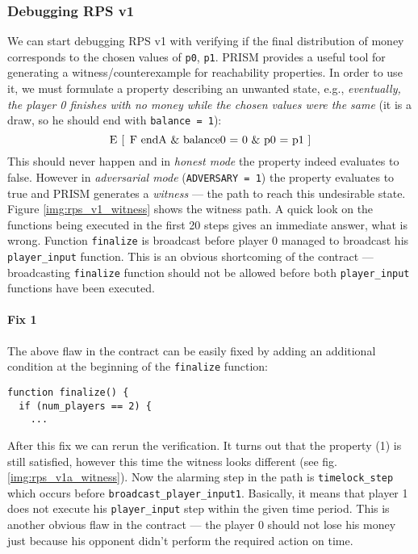 \documentclass{article}
\begin{document}
\subsubsection{Debugging RPS v1}
We can start debugging RPS v1 with verifying if the final distribution of money corresponds to the chosen values 
of \lstinline{p0}, \lstinline{p1}.
PRISM provides a useful tool for generating a witness/counterexample for reachability properties.
In order to use it, we must formulate a property describing an unwanted state, e.g., 
\textit{eventually, the player 0 finishes with no money
while the chosen values were the same} (it is a draw, so he should end with \lstinline{balance = 1}):
\begin{equation}
\text{\lstinline{E [ F endA & balance0 = 0 & p0 = p1 ]}}
\label{prop:rps_v1_witness}
\end{equation}
This should never happen and in \emph{honest mode} the property indeed evaluates to false.
However in \emph{adversarial mode} (\lstinline{ADVERSARY = 1}) the property evaluates to true and PRISM
generates a \emph{witness} --- the path to reach this undesirable state.
Figure \ref{img:rps_v1_witness} shows the witness path.
A quick look on the functions being executed in the first 20 steps gives an immediate answer, what is wrong.
Function \lstinline{finalize} is broadcast before player 0 managed to broadcast his \lstinline{player_input} function.
This is an obvious shortcoming of the contract --- broadcasting \lstinline{finalize} function should not be allowed
before both \lstinline{player_input} functions have been executed.

\paragraph{Fix 1} 

The above flaw in the contract can be easily fixed by adding an additional condition at the beginning of the 
\lstinline{finalize} function:
\begin{lstlisting}
function finalize() {
  if (num_players == 2) {
    ...
\end{lstlisting}

After this fix we can rerun the verification.
It turns out that the property (1) is still satisfied, however this
time the witness looks different (see fig. \ref{img:rps_v1a_witness}).
Now the alarming step in the path is \lstinline{timelock_step} which occurs before \lstinline{broadcast_player_input1}.
Basically, it means that player 1 does not execute his \lstinline{player_input} step within the given time period.
This is another obvious flaw in the contract --- the player 0 should not lose his money just because his opponent
didn't perform the required action on time.
\end{document}
